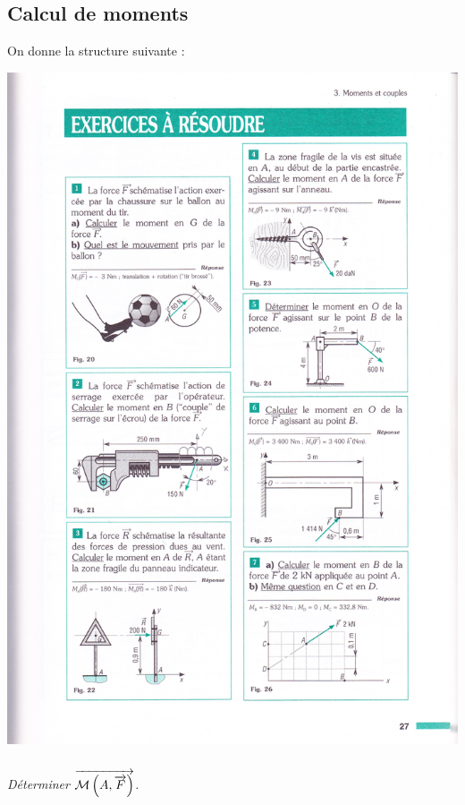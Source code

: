 \documentclass[10pt,fleqn]{article} %
\begin{document}
\begin{multicols}{2}
\section*{ Calcul de moments}
\setcounter{exo}{0}
\setcounter{subparagraph}{0}
On donne la structure suivante : 
\begin{center}
\includegraphics[width=.8\linewidth]{images/fig_23}
\end{center}

\subparagraph{}
\textit{Déterminer $\overrightarrow{\mathcal{M}\left(A,\overrightarrow{F} \right)}$.}




\end{multicols}
\end{document}
